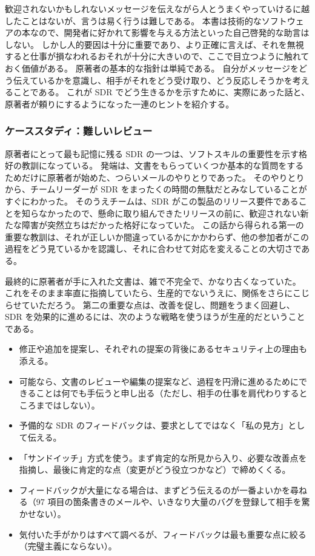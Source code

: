 \documentclass[uplatex]{jsarticle}
\begin{document}
歓迎されないかもしれないメッセージを伝えながら人とうまくやっていけるに越したことはないが、言うは易く行うは難しである。
本書は技術的なソフトウェアの本なので、開発者に好かれて影響を与える方法といった自己啓発的な助言はしない。
しかし人的要因は十分に重要であり、より正確に言えば、それを無視すると仕事が損なわれるおそれが十分に大きいので、ここで目立つように触れておく価値がある。
原著者の基本的な指針は単純である。
自分がメッセージをどう伝えているかを意識し、相手がそれをどう受け取り、どう反応しそうかを考えることである。
これが SDR でどう生きるかを示すために、実際にあった話と、原著者が頼りにするようになった一連のヒントを紹介する。

\subsubsection{ケーススタディ：難しいレビュー}

原著者にとって最も記憶に残る SDR の一つは、ソフトスキルの重要性を示す格好の教訓になっている。
発端は、文書をもらっていくつか基本的な質問をするためだけに原著者が始めた、つらいメールのやりとりであった。
そのやりとりから、チームリーダーが SDR をまったくの時間の無駄だとみなしていることがすぐにわかった。
そのうえチームは、SDR がこの製品のリリース要件であることを知らなかったので、懸命に取り組んできたリリースの前に、歓迎されない新たな障害が突然立ちはだかった格好になっていた。
この話から得られる第一の重要な教訓は、それが正しいか間違っているかにかかわらず、他の参加者がこの過程をどう見ているかを認識し、それに合わせて対応を変えることの大切さである。

最終的に原著者が手に入れた文書は、雑で不完全で、かなり古くなっていた。
これをそのまま率直に指摘していたら、生産的でないうえに、関係をさらにこじらせていただろう。
第二の重要な点は、改善を促し、問題をうまく回避し、SDR を効果的に進めるには、次のような戦略を使うほうが生産的だということである。
\begin{itemize}
\item 修正や追加を提案し、それぞれの提案の背後にあるセキュリティ上の理由も添える。
\item 可能なら、文書のレビューや編集の提案など、過程を円滑に進めるためにできることは何でも手伝うと申し出る（ただし、相手の仕事を肩代わりするところまではしない）。
\item 予備的な SDR のフィードバックは、要求としてではなく「私の見方」として伝える。
\item 「サンドイッチ」方式を使う。まず肯定的な所見から入り、必要な改善点を指摘し、最後に肯定的な点（変更がどう役立つかなど）で締めくくる。
\item フィードバックが大量になる場合は、まずどう伝えるのが一番よいかを尋ねる（97 項目の箇条書きのメールや、いきなり大量のバグを登録して相手を驚かせない）。
\item 気付いた手がかりはすべて調べるが、フィードバックは最も重要な点に絞る（完璧主義にならない）。
\end{itemize}
\end{document}
